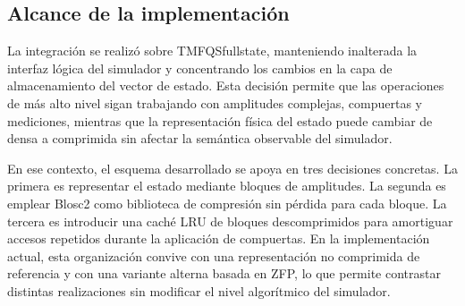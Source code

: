 \subsection{Alcance de la implementación}

La integración se realizó sobre TMFQSfullstate, manteniendo inalterada la interfaz lógica del simulador y concentrando los cambios en la capa de
almacenamiento del vector de estado. Esta decisión permite que las operaciones de más alto nivel sigan trabajando con amplitudes complejas, compuertas
y mediciones, mientras que la representación física del estado puede cambiar de densa a comprimida sin afectar la semántica observable del simulador.

En ese contexto, el esquema desarrollado se apoya en tres decisiones concretas. La primera es representar el estado mediante bloques de amplitudes.
La segunda es emplear Blosc2 como biblioteca de compresión sin pérdida para cada bloque. La tercera es introducir una caché LRU de bloques
descomprimidos para amortiguar accesos repetidos durante la aplicación de compuertas. En la implementación actual, esta organización convive con una representación no comprimida de referencia y con una variante alterna basada en ZFP, lo que permite contrastar distintas realizaciones sin modificar el nivel algorítmico del simulador.
